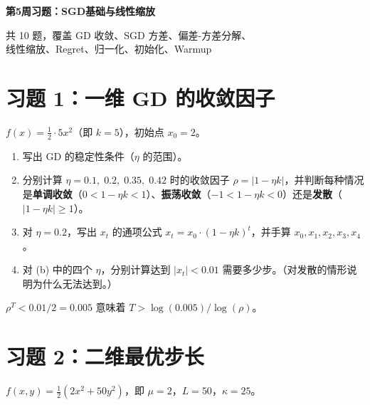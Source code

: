 \documentclass[12pt, a4paper]{ctexart}
\begin{document}
\begin{center}
{\LARGE\bfseries 第5周习题：SGD基础与线性缩放}

\vspace{0.3cm}
{\large 共 10 题，覆盖 GD 收敛、SGD 方差、偏差-方差分解、\\线性缩放、Regret、归一化、初始化、Warmup}
\end{center}

\vspace{0.5cm}

\section*{习题 1：一维 GD 的收敛因子}

$f(x) = \frac{1}{2} \cdot 5 x^2$（即 $k = 5$），初始点 $x_0 = 2$。

\begin{enumerate}
    \item[(a)] 写出 GD 的稳定性条件（$\eta$ 的范围）。
    
    \item[(b)] 分别计算 $\eta = 0.1,\; 0.2,\; 0.35,\; 0.42$ 时的收敛因子 $\rho = |1 - \eta k|$，并判断每种情况是\textbf{单调收敛}（$0 < 1-\eta k < 1$）、\textbf{振荡收敛}（$-1 < 1-\eta k < 0$）还是\textbf{发散}（$|1-\eta k| \geq 1$）。
    
    \item[(c)] 对 $\eta = 0.2$，写出 $x_t$ 的通项公式 $x_t = x_0 \cdot (1-\eta k)^t$，并手算 $x_0, x_1, x_2, x_3, x_4$。
    
    \item[(d)] 对 (b) 中的四个 $\eta$，分别计算达到 $|x_t| < 0.01$ 需要多少步。（对发散的情形说明为什么无法达到。）
\end{enumerate}

\begin{hint}
$\rho^T < 0.01/2 = 0.005$ 意味着 $T > \log(0.005)/\log(\rho)$。
\end{hint}


\section*{习题 2：二维最优步长}

$f(x,y) = \frac{1}{2}(2x^2 + 50y^2)$，即 $\mu = 2$，$L = 50$，$\kappa = 25$。
\end{document}
